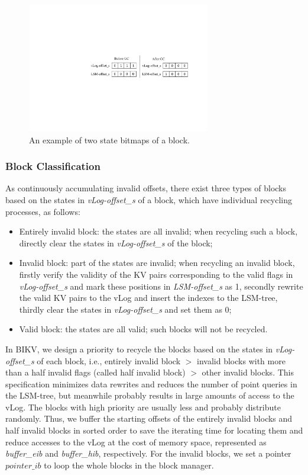 \documentclass[sigconf]{acmart}
\begin{document}
\begin{figure}[!t]
	\setlength{\abovecaptionskip}{0.cm}	
	\setlength{\belowcaptionskip}{-0.cm}
	\centerline{\includegraphics[width=80mm]{bitmap.pdf}}
	\caption{An example of two state bitmaps of a block.}
	\label{fig:iblock}
\end{figure}

\subsubsection{Block Classification}
As continuously accumulating invalid offsets, there exist three types of blocks based on the states in \textit{vLog-offset\_s} of a block, which have individual recycling processes, as follows: 
\begin{itemize}
	\item Entirely invalid block: the states are all invalid; when recycling such a block, directly clear the states in \textit{vLog-offset\_s} of the block;
	\item Invalid block: part of the states are invalid; when recycling an invalid block, firstly verify the validity of the KV pairs corresponding to the valid flags in \textit{vLog-offset\_s} and mark these positions in \textit{LSM-offset\_s} as 1, secondly rewrite the valid KV pairs to the vLog and insert the indexes to the LSM-tree, thirdly clear the states in \textit{vLog-offset\_s} and set them as 0;
	\item Valid block: the states are all valid; such blocks will not be recycled.
\end{itemize}

In BIKV, we design a priority to recycle the blocks based on the states in \textit{vLog-offset\_s} of each block, i.e., entirely invalid block $>$ invalid blocks with more than a half invalid flags (called half invalid block) $>$ other invalid blocks. This specification minimizes data rewrites and reduces the number of point queries in the LSM-tree, but meanwhile probably results in large amounts of access to the vLog. The blocks with high priority are usually less and probably distribute randomly. Thus, we buffer the starting offsets of the entirely invalid blocks and half invalid blocks in sorted order to save the iterating time for locating them and reduce accesses to the vLog at the cost of memory space, represented as \textit{buffer\_eib} and \textit{buffer\_hib}, respectively. For the invalid blocks, we set a pointer $pointer\_ib$ to loop the whole blocks in the block manager.
\end{document}
